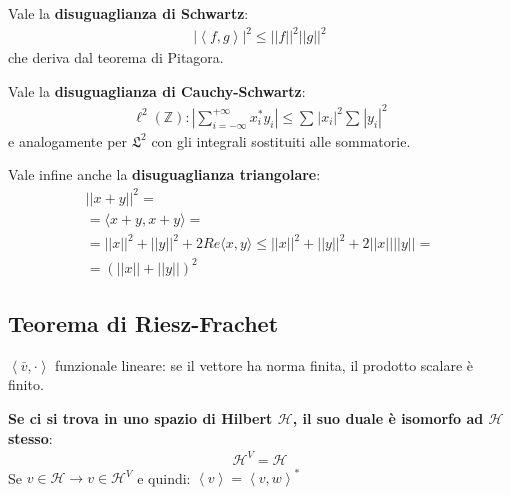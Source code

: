 Vale la \textbf{disuguaglianza di Schwartz}:
\begin{equation}\begin{split}
|\left\langle f,g \right\rangle|^2\le ||f||^2||g||^2
\end{split}\end{equation}
che deriva dal teorema di Pitagora.

Vale la \textbf{disuguaglianza di Cauchy-Schwartz}:
\begin{equation}\begin{split}
\ell^2\left(\mathbb{Z}\right): |\sum_{i=-\infty }^{+\infty }{x^*_iy_i}|\le \sum_{}^{}{|x_i|^2}\sum_{}^{}{|y_i|^2}
\end{split}\end{equation}
e analogamente per $\mathfrak{L}^2$ con gli integrali sostituiti alle sommatorie.

Vale infine anche la \textbf{disuguaglianza triangolare}:
\begin{equation}\begin{split}
||x+y||^2=\\
=\langle x+y,x+y \rangle=\\
=||x||^2+||y||^2+2Re\langle x,y\rangle\le ||x||^2+||y||^2+2||x||||y||=\\
=\left(||x||+||y||\right)^2
\end{split}\end{equation}

\subsection{Teorema di Riesz-Frachet} %
$\left\langle \bar v,\cdot  \right\rangle$ funzionale lineare: se il vettore ha norma finita, il prodotto scalare è finito.

\textbf{Se ci si trova in uno spazio di Hilbert $\mathcal{H}$, il suo duale è isomorfo ad $\mathcal{H}$ stesso}: \begin{equation}\begin{split}
\mathcal{H}^V=\mathcal{H}
\end{split}\end{equation}
Se $v\in \mathcal{H} \rightarrow v \in \mathcal{H}^V$ e quindi: $\left\langle v \right\rangle=\left\langle v,w \right\rangle^*$

